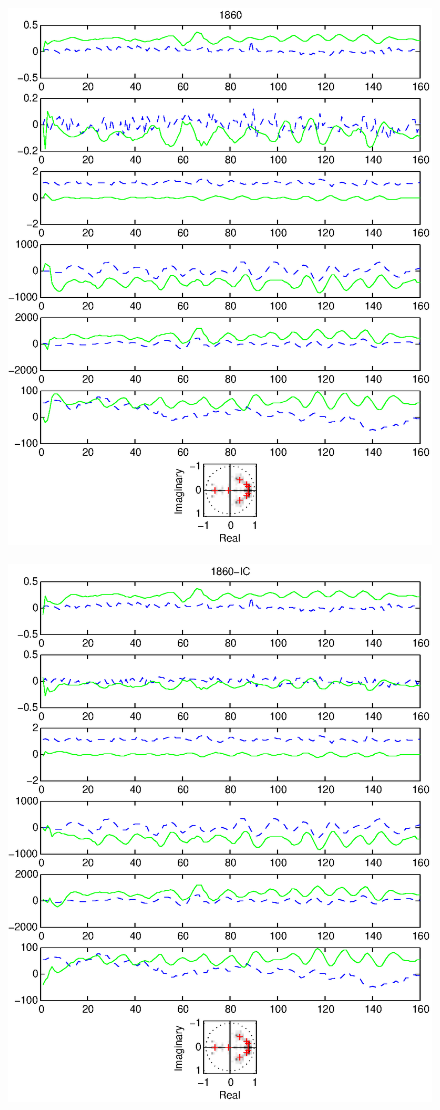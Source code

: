 \documentclass{article}
\begin{document}
\begin{figure}[htb!]
\centering
\includegraphics{1860.eps}
\end{figure}
\begin{figure}[htb!]
\centering
\includegraphics{1860_ic.eps}
\end{figure}\clearpage
\end{document}
